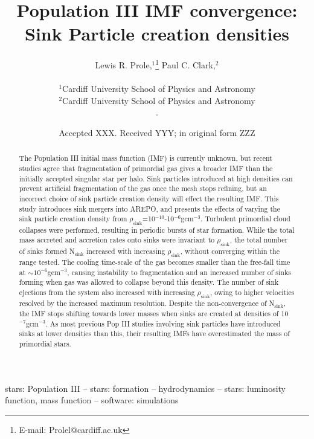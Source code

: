 \documentclass[fleqn,usenatbib]{mnras}
\title[Population III IMF convergence: Sink Particle creation densities]{Population III IMF convergence: Sink Particle creation densities}
\author[L. R. Prole]{
Lewis R. Prole,$^{1}$\thanks{E-mail: Prolel@cardiff.ac.uk}
Paul C. Clark,$^{2}$
$$
$$
\\
$^{1}$Cardiff University School of Physics and Astronomy\\
$^{2}$Cardiff University School of Physics and Astronomy\\
$.$
}
\date{Accepted XXX. Received YYY; in original form ZZZ}
\begin{document}
\label{firstpage}
\pagerange{\pageref{firstpage}--\pageref{lastpage}}
\maketitle

\begin{abstract}
The Population III initial mass function (IMF) is currently unknown, but recent studies agree that fragmentation of primordial gas gives a broader IMF than the initially accepted singular star per halo. Sink particles introduced at high densities can prevent artificial fragmentation of the gas once the mesh stops refining, but an incorrect choice of sink particle creation density will effect the resulting IMF. This study introduces sink mergers into AREPO, and presents the effects of varying the sink particle creation density from $\rho_{\text{sink}}$=10$^{-10}$-10$^{-6}$gcm$^{-3}$. Turbulent primordial cloud collapses were performed, resulting in periodic bursts of star formation. While the total mass accreted and accretion rates onto sinks were invariant to $\rho_{\text{sink}}$, the total number of sinks formed N$_{\text{sink}}$ increased with increasing $\rho_{\text{sink}}$, without converging within the range tested. The cooling time-scale of the gas becomes smaller than the free-fall time at $\sim 10^{-6}$gcm$^{-3}$, causing instability to fragmentation and an increased number of sinks forming when gas was allowed to collapse beyond this density. The number of sink ejections from the system also increased with increasing $\rho_{\text{sink}}$, owing to higher velocities resolved by the increased maximum resolution. Despite the non-convergence of N$_{\text{sink}}$, the IMF stops shifting towards lower masses when sinks are created at densities of 10$^{-7}$gcm$^{-3}$. As most previous Pop III studies involving sink particles have introduced sinks at lower densities than this, their resulting IMFs have overestimated the mass of primordial stars.
\end{abstract}

\begin{keywords}
stars: Population III -- stars: formation -- hydrodynamics -- stars: luminosity function, mass function -- software: simulations
\end{keywords}

\end{document}
